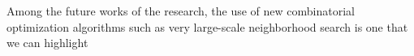 \documentclass[conference]{IEEEtran}
\begin{document}
Among the future works of the research, the use of new combinatorial optimization algorithms such as very large-scale neighborhood search is one that we can highlight















\end{document}
